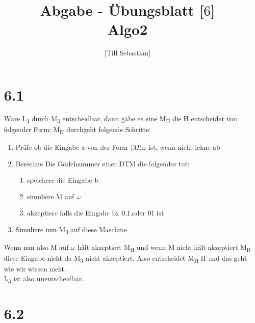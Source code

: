 \documentclass[10pt,a4paper]{article}
\begin{document}
\title{Abgabe - Übungsblatt [$6$]\\
\small{Algo2}}
\author{ [Till Sebastian]}

\maketitle

\section*{6.1}
Wäre L\textsubscript{3} durch M\textsubscript{$3$} entscheidbar, dann gäbe es eine M\textsubscript{H} die H entscheidet von folgender Form:
M\textsubscript{H} durchgeht folgende Schritte:
\begin{enumerate}
	\item Prüfe ob die Eingabe a von der Form $\langle M\rangle $$\omega$ ist, wenn nicht lehne ab
	\item Berechne Die Gödelnummer einer DTM die folgendes tut:
	\begin{enumerate}
		\item speichere die Eingabe b
		\item simuliere M auf $\omega$
		\item akzeptiere falls die Eingabe bx 0,1,oder 01 ist
	\end{enumerate}
	
	\item Simuliere nun M\textsubscript{3} auf diese Maschine
\end{enumerate}
Wenn nun also M auf $\omega$ hält akzeptiert M\textsubscript{H} und wenn M nicht hält akzeptiert M\textsubscript{H} diese Eingabe nicht da M\textsubscript{3} nicht akzeptiert.
Also entscheidet M\textsubscript{H} H und das geht wie wir wissen nicht.
\\L\textsubscript{3} ist also unentscheidbar.



\section*{6.2}
\end{document}
